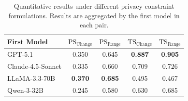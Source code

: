 \begin{table}[t]
\centering
\small
\setlength{\tabcolsep}{4pt}
\begin{tabular}{lcccc}
\toprule
\textbf{First Model} & \textbf{$\text{PS}_{\text{Change}}$} & \textbf{$\text{PS}_{\text{Range}}$} & \textbf{$\text{TS}_{\text{Change}}$} & \textbf{$\text{TS}_{\text{Range}}$} \\
\midrule
GPT-5.1 & 0.350 & 0.645 & \textbf{0.887} & \textbf{0.905} \\
Claude-4.5-Sonnet & 0.335 & 0.660 & 0.709 & 0.726 \\
LLaMA-3.3-70B & \textbf{0.370} & \textbf{0.685} & 0.495 & 0.467 \\
Qwen-3-32B & 0.245 & 0.580 & 0.630 & 0.685 \\
\bottomrule
\end{tabular}
\caption{Quantitative results under different privacy constraint formulations. Results are aggregated by the first model in each pair.}
\label{tab:different_constraints}
\end{table}